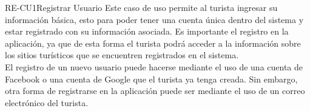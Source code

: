 
% 



	\begin{UseCase}{RE-CU1}{Registrar Usuario}{
		Este caso de uso permite al turista ingresar su información básica, esto para poder tener una cuenta única dentro del sistema y estar registrado con su información asociada. Es importante el registro en la aplicación, ya que de esta forma el turista podrá acceder a la información sobre los sitios turísticos que se encuentren registrados en el sistema.\\
		
		El registro de un nuevo usuario puede hacerse mediante el uso de una cuenta de Facebook o una cuenta de Google que el turista ya tenga creada. Sin embargo, otra forma de registrarse en la aplicación puede ser mediante el uso de un correo electrónico del turista. \\
		
}
\end{UseCase}
